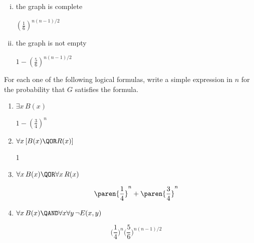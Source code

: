 \documentclass[quiz]{mcs}
\begin{document}
\begin{problem}
\begin{enumerate}[(i)]
\item  the graph is complete
\begin{solution}
	$(\tfrac{1}{6})^{n(n-1)/2}$
\end{solution}\brule{0.5in}

%

%

\item the graph is not empty
\begin{solution}
$1 - (\tfrac{5}{6})^{n(n-1)/2}$
\end{solution}\brule{0.5in}

\end{enumerate}

\ppart For each one of the following logical formulas, write a simple
expression in $n$ for the probability that $G$ satisfies the formula.

\begin{enumerate}

\item
$\exists x\, B(x)$ \brule{0.5in}

\begin{solution}
$1 - (\tfrac{3}{4})^n$
\end{solution}

\item  $\forall x\, [B(x) \QOR R(x)]$ \brule{0.5in}

\begin{solution}
1
\end{solution}

\item  $\forall x\, B(x) \QOR \forall x\, R(x)$\brule{0.5in}

\begin{solution}
\[
\paren{\frac{1}{4}}^n + \paren{\frac{3}{4}}^n
\]
\end{solution}

\item $\forall x\, B(x) \QAND \forall x\forall y\, \neg E(x,y)$\brule{0.5in}

\begin{solution}
\[
\bigl(\frac{1}{4}\bigr)^n\bigl(\frac{5}{6}\bigr)^{n(n-1)/2}
\]
\end{solution}


\end{enumerate}
\end{problem}
\end{document}
